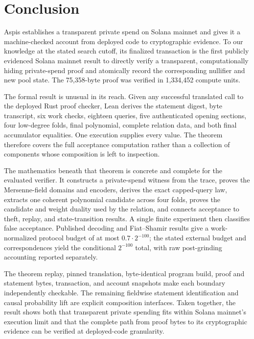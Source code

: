 \section{Conclusion}
\label{sec:conclusion}

Aspis establishes a transparent private spend on Solana mainnet and gives it a
machine-checked account from deployed code to cryptographic evidence.  To our
knowledge at the stated search cutoff, its finalized transaction is the first
publicly evidenced Solana mainnet result to directly verify a transparent,
computationally hiding private-spend proof and atomically record the
corresponding nullifier and new pool state.  The 75,358-byte proof was verified
in 1,334,452 compute units.

The formal result is unusual in its reach.  Given any successful translated
call to the deployed Rust proof checker, Lean derives the statement digest,
byte transcript, six work checks, eighteen queries, five authenticated opening
sections, four low-degree folds, final polynomial, complete relation data, and
both final accumulator equalities.  One execution supplies every value.  The
theorem therefore covers the full acceptance computation rather than a
collection of components whose composition is left to inspection.

The mathematics beneath that theorem is concrete and complete for the
evaluated verifier.  It constructs a private-spend witness from the trace,
proves the Mersenne-field domains and encoders, derives the exact capped-query
law, extracts one coherent polynomial candidate across four folds, proves the
candidate and weight duality used by the relation, and connects acceptance to
theft, replay, and state-transition results.  A single finite experiment then
classifies false acceptance.  Published decoding and Fiat--Shamir results give
a work-normalized protocol budget of at most \(0.7\cdot2^{-100}\); the stated
external budget and correspondences yield the conditional \(2^{-100}\) total,
with raw post-grinding accounting reported separately.

The theorem replay, pinned translation, byte-identical program build, proof
and statement bytes, transaction, and account snapshots make each boundary
independently checkable.  The remaining fieldwise statement identification
and causal probability lift are explicit composition interfaces.  Taken
together, the result shows both that transparent private spending fits within
Solana mainnet's execution limit and that the complete path from proof bytes
to its cryptographic evidence can be verified at deployed-code granularity.
